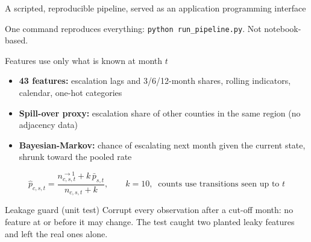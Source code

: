 \documentclass[aspectratio=169,11pt]{beamer}
\newcommand{\code}[1]{\texttt{#1}}
\newcommand{\hl}[1]{{\color{navy}\textbf{#1}}}
\begin{document}
\begin{frame}{A scripted, reproducible pipeline, served as an application programming interface}
  \centering
  \vspace{4pt}
  \par\vspace{10pt}
  {\small One command reproduces everything: \code{python run\_pipeline.py}. Not notebook-based.\par}
\end{frame}

\begin{frame}{Features use only what is known at month $t$}
  \begin{itemize}\setlength{\itemsep}{5pt}
    \item \hl{43 features:} escalation lags and 3/6/12-month shares, rolling indicators, calendar, one-hot categories
    \item \hl{Spill-over proxy:} escalation share of other counties in the same region (no adjacency data)
    \item \hl{Bayesian-Markov:} chance of escalating next month given the current state, shrunk toward the pooled rate
  \end{itemize}
  \[
    \hat p_{c,s,t}=\frac{n^{\to 1}_{c,s,t}+k\,\bar p_{s,t}}{n_{c,s,t}+k},\qquad k=10,\;\; \text{counts use transitions seen up to } t
  \]
  \begin{block}{Leakage guard (unit test)}
    \small Corrupt every observation after a cut-off month: no feature at or before it may change. The test caught two planted leaky features and left the real ones alone.
  \end{block}
\end{frame}
\end{document}
